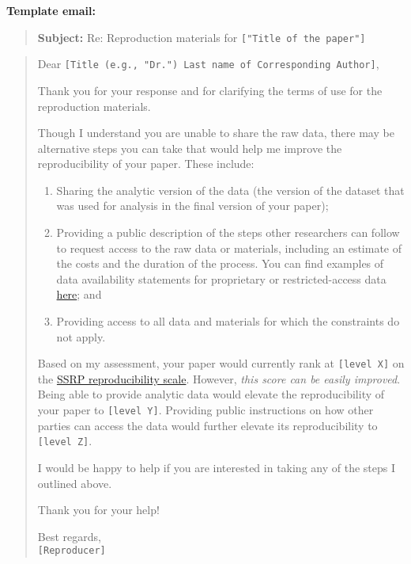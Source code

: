 \textbf{Template email:}

\begin{quote}
\textbf{Subject:} Re: Reproduction materials for
\texttt{{[}"Title\ of\ the\ paper"{]}}
\end{quote}

\begin{quote}
Dear
\texttt{{[}Title\ (e.g.,\ "Dr.")\ Last\ name\ of\ Corresponding\ Author{]}},

Thank you for your response and for clarifying the terms of use for the
reproduction materials.

Though I understand you are unable to share the raw data, there may be
alternative steps you can take that would help me improve the
reproducibility of your paper. These include:

\begin{enumerate}
\def\labelenumi{\arabic{enumi}.}
\tightlist
\item
  Sharing the analytic version of the data (the version of the dataset
  that was used for analysis in the final version of your paper);\\
\item
  Providing a public description of the steps other researchers can
  follow to request access to the raw data or materials, including an
  estimate of the costs and the duration of the process. You can find
  examples of data availability statements for proprietary or
  restricted-access data
  \href{https://social-science-data-editors.github.io/guidance/Requested_information_dcas.html}{here};
  and\\
\item
  Providing access to all data and materials for which the constraints
  do not apply.
\end{enumerate}

Based on my assessment, your paper would currently rank at
\texttt{{[}level\ X{]}} on the
\href{https://bitss.github.io/ACRE/assessment.html\#levels-of-computational-reproducibility-for-a-specific-output}{SSRP
reproducibility scale}. However, \textit{this score can be easily
improved}. Being able to provide analytic data would elevate the
reproducibility of your paper to \texttt{{[}level\ Y{]}}. Providing
public instructions on how other parties can access the data would
further elevate its reproducibility to \texttt{{[}level\ Z{]}}.

I would be happy to help if you are interested in taking any of the
steps I outlined above.

Thank you for your help!

Best regards,\\
\texttt{{[}Reproducer{]}}
\end{quote}

